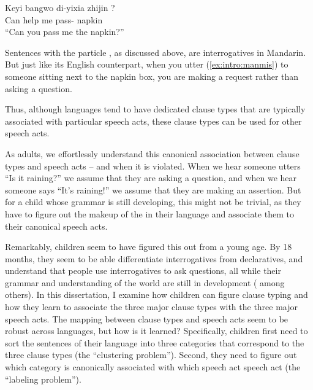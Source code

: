 \gll Keyi bangwo di-yixia zhijin ?\\
Can help me pass-\Clf{} napkin \Sfp{}\\
``Can you pass me the napkin?''
\eex

Sentences with the particle , as discussed above, are interrogatives in Mandarin. But just like its English counterpart, when you utter (\ref{ex:intro:manmis}) to someone sitting next to the napkin box, you are making a request rather than asking a question. 

Thus, although languages tend to have dedicated clause types that are typically associated with particular speech acts, these clause types can be used for other speech acts. 

As adults, we effortlessly understand this canonical association between clause types and speech acts -- and when it is violated. When we hear someone utters ``Is it raining?'' we assume that they are asking a question, and when we hear someone says ``It's raining!'' we assume that they are making an assertion.  But for a child whose grammar is still developing, this might not be trivial, as they have to figure out the makeup of the \diis{} in their language and associate them to their canonical speech acts.   %

Remarkably, children seem to have figured this out from a young age. By 18 months, they seem to be able differentiate interrogatives from declaratives, and understand that people use interrogatives to ask questions, all while their grammar and understanding of the world are still in development (\cite{geffenmintz2011,geffenmintz2015wordorder,casillas2017turn,perkins2019,marshmallowqueen} among others). In this dissertation, I examine how children can figure clause typing and how they learn to associate the three major clause types with the three major speech acts. The mapping between clause types and speech acts seem to be robust across languages, but how is it learned? Specifically, children first need to sort the sentences of their language into three categories that correspond to the three clause types (the ``clustering problem''). Second, they need to figure out which category is canonically associated with which speech act speech act (the ``labeling problem'').

